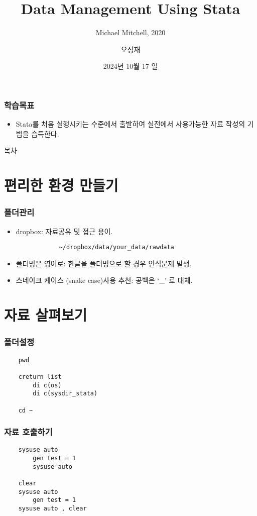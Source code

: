 \documentclass[aspectratio=169,xcolor=dvipsnames,handout]{beamer}
\title{Data Management Using Stata }
\subtitle{Michael Mitchell, 2020}
\author{오성재}
\institute[CNU]
{\relax
    전북대학교 Stata 특강\
}
\date{2024년 10월 17 일}
\begin{document}

\frame{\titlepage}

\begin{frame}
\frametitle{학습목표}
    \begin{itemize}[<+->]
    \item Stata를 처음 실행시키는 수준에서 출발하여 실전에서 사용가능한 자료 작성의 기법을 습득한다.
    \end{itemize}
\end{frame}

\begin{frame}{목차}
    \small
    \tableofcontents[hideallsubsections]
\end{frame}

\section{편리한 환경 만들기}

\begin{frame}
    \frametitle{폴더관리}
    \begin{itemize}[<+->]
        \item dropbox: 자료공유 및 접근 용이.
        \begin{verbatim}
            ~/dropbox/data/your_data/rawdata
        \end{verbatim}
        \item 폴더명은 영어로: 한글을 폴더명으로 할 경우 인식문제 발생.
        \item 스네이크 케이스 (snake case)사용 추천: 공백은 `\_' 로 대체.
    \end{itemize}
\end{frame}



\section{자료 살펴보기}

\begin{frame}[fragile]
\frametitle{폴더설정}
    \begin{verbatim}
    pwd

    creturn list
        di c(os)
        di c(sysdir_stata)

    cd ~
    \end{verbatim}
\end{frame}

\begin{frame}[fragile]
    \frametitle{자료 호출하기}
    \begin{verbatim}
    sysuse auto
        gen test = 1
        sysuse auto

    clear
    sysuse auto
        gen test = 1
    sysuse auto , clear
    \end{verbatim}
\end{frame}
\end{document}
